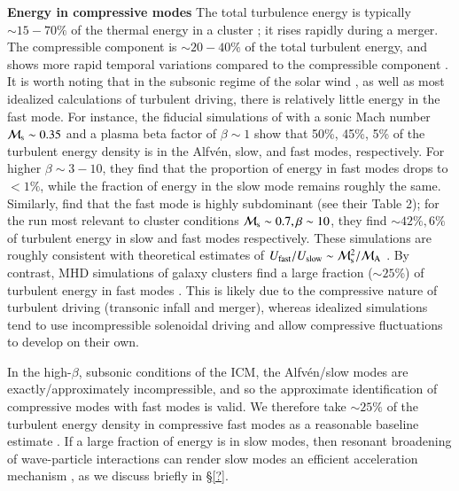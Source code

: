 \documentclass[fleqn,usenatbib,useAMS]{mnras}
\begin{document}
{\bf Energy in compressive modes} The total turbulence energy is typically $\sim 15-70\%$ of the thermal energy in a cluster \citep{vazza11}; it rises rapidly during a merger. The compressible component is $\sim 20-40\%$ of the total turbulent energy, and shows more rapid temporal variations compared to the compressible component \citep{2013ApJ...771..131B,miniati15}. It is worth noting that in the subsonic regime of the solar wind \citep{yao11,howes12}, as well as most idealized calculations of turbulent driving, there is relatively little energy in the fast mode. For instance, the fiducial simulations of \citet{lynn14} with a sonic Mach number ${\mathcal M}_{\rm s} \sim 0.35$ and a plasma beta factor of $\beta \sim 1$ show that 50\%, 45\%, 5\% of the turbulent energy density is in the Alfv{\'e}n, slow, and fast modes, respectively. For higher $\beta \sim 3-10$, they find that the proportion of energy in fast modes drops to $< 1\%$, while the fraction of energy in the slow mode remains roughly the same. Similarly, \citet{kowal10} find that the fast mode is highly subdominant (see their Table 2); for the run most relevant to cluster conditions ${\mathcal M}_{\rm s} \sim 0.7, \beta \sim 10$, they find $\sim 42\%, 6\%$ of turbulent energy in slow and fast modes respectively. These simulations are roughly consistent with theoretical estimates of $U_{\rm fast}/U_{\rm slow} \sim {\mathcal M}_{\rm s}^{2}/{\mathcal M}_{\rm A}$ \citep{cho03}. By contrast, MHD simulations of galaxy clusters find a large fraction ($\sim 25$\%) of turbulent energy in fast modes \citep{2013ApJ...771..131B}. This is likely due to the compressive nature of turbulent driving (transonic infall and merger), whereas idealized simulations tend to use incompressible solenoidal driving and allow compressive fluctuations to develop on their own. 

In the high-$\beta$, subsonic conditions of the ICM, the Alfv{\'e}n/slow modes are exactly/approximately incompressible, and so the approximate identification of compressive modes with fast modes is valid. We therefore take $\sim 25\%$ of the turbulent energy density in compressive fast modes as a reasonable baseline estimate \citep{2013ApJ...771..131B,miniati15}. If a large fraction of energy is in slow modes, then resonant broadening of wave-particle interactions can render slow modes an efficient acceleration mechanism \citep{lynn14}, as we discuss briefly in \S\ref{?}.
\end{document}
